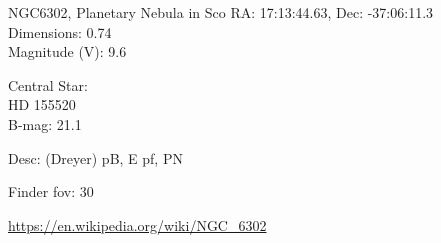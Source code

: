 \begin{block}{NGC6302, Planetary Nebula in Sco}
    RA: 17:13:44.63, Dec: -37:06:11.3 \\ 
    Dimensions: 0.74 \\ 
    Magnitude (V): 9.6

    Central Star: \\ 
      \hspace{1em}HD 155520 \\ 
      \hspace{1em}B-mag: 21.1 

    Desc: (Dreyer) pB, E pf, PN 

    Finder fov: 30 

    \url{https://en.wikipedia.org/wiki/NGC_6302} 
\end{block}